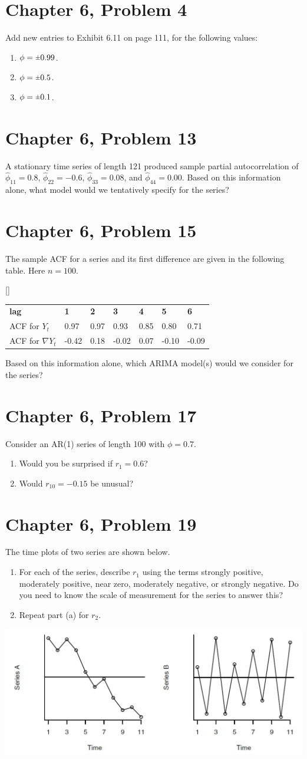 \documentclass[11pt]{article}
\newif\ifclearpage
\newcommand{\rpm}{\sbox0{$1$}\sbox2{$\scriptstyle\pm$}
  \raise\dimexpr(\ht0-\ht2)/2\relax\box2 }
\newcommand{\problem}[1]{\section*{#1}}
\newcommand{\solution}{\hrulefill}
\newcommand{\maybeclearpage}{\ifclearpage\clearpage\fi}
\begin{document}
\problem{Chapter 6, Problem 4}
Add new entries to Exhibit 6.11 on page 111, for the following values:
\begin{enumerate}
\item $\phi = \rpm 0.99$.
\item $\phi = \rpm 0.5$.
\item $\phi = \rpm 0.1$.
\end{enumerate}

\solution


\maybeclearpage
\problem{Chapter 6, Problem 13}
A stationary time series of length 121 produced sample partial autocorrelation of $\hat{\phi}_{11} = 0.8$, $\hat{\phi}_{22} = -0.6$, $\hat{\phi}_{33} = 0.08$, and $\hat{\phi}_{44} = 0.00$. Based on this information alone, what model would we tentatively specify for the series?

\solution


\maybeclearpage
\problem{Chapter 6, Problem 15}
The sample ACF for a series and its first difference are given in the following table. Here $n = 100$.

\begin{center}[]
\begin{tabular}{lllllll}
 \textbf{lag} & \textbf{1} & \textbf{2} & \textbf{3} & \textbf{4} & \textbf{5} & \textbf{6} \\
 ACF for $Y_t$ & 0.97 & 0.97 & 0.93 & 0.85 & 0.80 & 0.71 \\
 ACF for $\nabla Y_t$ & -0.42 & 0.18 & -0.02 & 0.07 & -0.10 & -0.09
\end{tabular}
\end{center}

Based on this information alone, which ARIMA model(s) would we consider for the series?

\solution

\maybeclearpage
\problem{Chapter 6, Problem 17}
Consider an AR(1) series of length 100 with $\phi = 0.7$.
\begin{enumerate}
\item Would you be surprised if $r_1 = 0.6$?
\item Would $r_{10} = -0.15$ be unusual?
\end{enumerate}

\solution


\maybeclearpage
\problem{Chapter 6, Problem 19}
The time plots of two series are shown below.
\begin{enumerate}
	\item For each of the series, describe $r_1$ using the terms strongly positive, moderately positive, near zero, moderately negative, or strongly negative. Do you need to know the scale of measurement for the series to answer this?
	\item Repeat part (a) for $r_2$.
\end{enumerate}

\centerline{\includegraphics{graphs.jpg}}

\solution


\maybeclearpage
\end{document}
